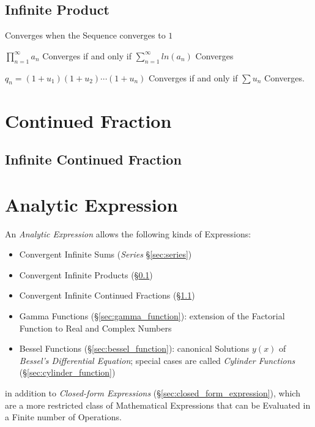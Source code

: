 \subsection{Infinite Product}\label{sec:infinite_product}

Converges when the Sequence converges to $1$

$\prod_{n=1}^\infty a_n$ Converges if and only if $\sum_{n=1}^\infty
ln(a_n)$ Converges

$q_n = (1 + u_1)(1 + u_2)\cdots(1 + u_n)$ Converges if and only if
$\sum u_n$ Converges.



\section{Continued Fraction}\label{sec:continued_fraction}

\subsection{Infinite Continued Fraction}\label{sec:infinite_continued_fraction}



\section{Analytic Expression}\label{sec:analytic_expression}

An \emph{Analytic Expression} allows the following kinds of Expressions:
\begin{itemize}
  \item Convergent Infinite Sums (\emph{Series} \S\ref{sec:series})
  \item Convergent Infinite Products (\S\ref{sec:infinite_product})
  \item Convergent Infinite Continued Fractions
    (\S\ref{sec:infinite_continued_fraction})
  \item Gamma Functions (\S\ref{sec:gamma_function}): extension of the Factorial
    Function to Real and Complex Numbers
  \item Bessel Functions (\S\ref{sec:bessel_function}): canonical Solutions
    $y(x)$ of \emph{Bessel's Differential Equation}; special cases are called
    \emph{Cylinder Functions} (\S\ref{sec:cylinder_function})
\end{itemize}
in addition to \emph{Closed-form Expressions}
(\S\ref{sec:closed_form_expression}), which are a more restricted class of
Mathematical Expressions that can be Evaluated in a Finite number of Operations.


